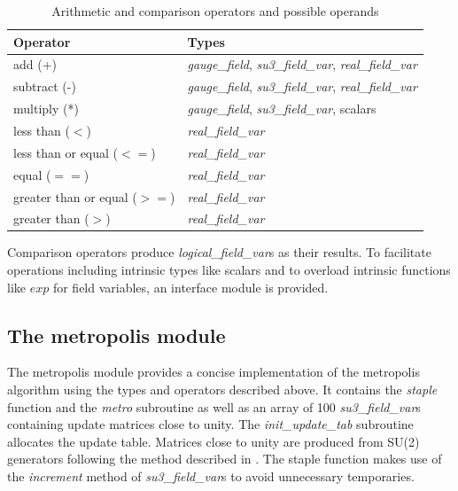 \documentclass[graybox]{svmult}
\begin{document}
\begin{table}
\caption{Arithmetic and comparison operators and possible operands}
\label{tab:ops}
\begin{tabular}{l|l}
Operator & Types \\
\hline
add (+) & \emph{gauge\_field}, \emph{su3\_field\_var}, \emph{real\_field\_var} \\
subtract (-) & \emph{gauge\_field}, \emph{su3\_field\_var}, \emph{real\_field\_var} \\
multiply (*) & \emph{gauge\_field}, \emph{su3\_field\_var}, scalars \\
less than ($<$) & \emph{real\_field\_var} \\
less than or equal ($<=$) & \emph{real\_field\_var} \\
equal ($==$) & \emph{real\_field\_var} \\
greater than or equal ($>=$) & \emph{real\_field\_var} \\
greater than ($>$) & \emph{real\_field\_var} \\
\end{tabular}
\end{table}
Comparison operators produce \emph{logical\_field\_var}s as their results. To facilitate operations including intrinsic types like scalars and to overload intrinsic functions like $exp$ for field variables, an interface module is provided.

\subsection{The metropolis module}

The metropolis module provides a concise implementation of the metropolis algorithm using the types and operators described above. It contains the \emph{staple} function and the \emph{metro} subroutine as well as an array of 100 \emph{su3\_field\_var}s containing update matrices close to unity. The \emph{init\_update\_tab} subroutine allocates the update table. Matrices close to unity are produced from SU(2) generators following the method described in \cite{gattringer}. The staple function makes use of the \emph{increment} method of \emph{su3\_field\_var}s to avoid unnecessary temporaries.
\end{document}
